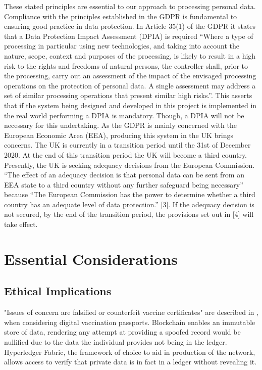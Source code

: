 \documentclass{report}
\begin{document}
\begin{flushleft}
These stated principles are essential to our approach to
processing personal data. Compliance with the principles
established in the GDPR is fundamental to ensuring good
practice in data protection.
In Article 35(1) of the GDPR it states that a Data Protection
Impact Assessment (DPIA) is required “Where a type of
processing in particular using new technologies, and taking
into account the nature, scope, context and purposes of the
processing, is likely to result in a high risk to the rights and
freedoms of natural persons, the controller shall, prior to the
processing, carry out an assessment of the impact of the
envisaged processing operations on the protection of personal
data. A single assessment may address a set of similar
processing operations that present similar high risks.”. This
asserts that if the system being designed and developed in this
project is implemented in the real world performing a DPIA is
mandatory. Though, a DPIA will not be necessary for this
undertaking.
As the GDPR is mainly concerned with the European
Economic Area (EEA), producing this system in the UK
brings concerns. The UK is currently in a transition period
until the 31st of December 2020. At the end of this transition
period the UK will become a third country. Presently, the UK
is seeking adequacy decisions from the European
Commission. “The effect of an adequacy decision is that
personal data can be sent from an EEA state to a third country
without any further safeguard being necessary” because “The
European Commission has the power to determine whether a
third country has an adequate level of data protection.” [3]. If
the adequacy decision is not secured, by the end of the
transition period, the provisions set out in [4] will take effect.


\chapter{Essential Considerations}

\section{Ethical Implications}

"Issues of concern are falsified or counterfeit vaccine certificates" are described in \cite{schlagenhauf_variants_2021}, when considering digital vaccination passports. 
Blockchain enables an immutable store of data, rendering any attempt at providing a spoofed record would be nullified due to the data the individual provides not being in the ledger.
Hyperledger Fabric, the framework of choice to aid in production of the network, allows access to verify that private data is in fact in a ledger without revealing it. %


\end{flushleft}
\end{document}
